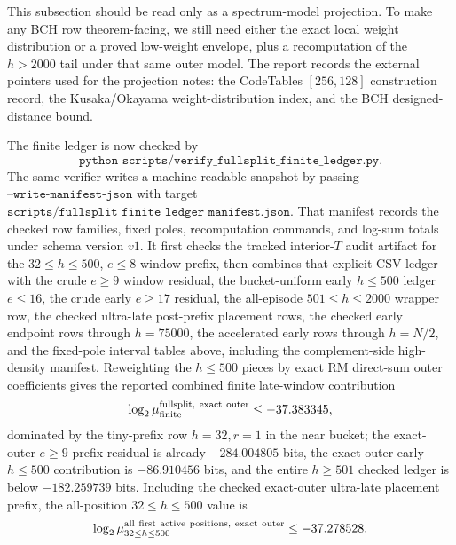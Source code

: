 This subsection should be read only as a spectrum-model projection.  To make any BCH row theorem-facing, we still need
either the exact local weight distribution or a proved low-weight envelope, plus a recomputation of the \(h>2000\) tail
under that same outer model.  The report records the external pointers used for the projection notes: the CodeTables
\([256,128]\) construction record, the Kusaka/Okayama weight-distribution index, and the BCH designed-distance bound.

The finite ledger is now checked by
\[
\texttt{python scripts/verify\_fullsplit\_finite\_ledger.py}.
\]
The same verifier writes a machine-readable snapshot by passing \(\texttt{--write-manifest-json}\) with target
\(\texttt{scripts/fullsplit\_finite\_ledger\_manifest.json}\).
That manifest records the checked row families, fixed poles, recomputation commands, and log-sum totals under schema
version \(v1\).
It first checks the tracked interior-\(T\) audit artifact for the \(32\le h\le500\), \(e\le8\) window prefix, then combines
that explicit CSV ledger with the crude \(e\ge9\) window residual, the bucket-uniform early \(h\le500\) ledger
\(e\le16\), the crude early \(e\ge17\) residual, the all-episode \(501\le h\le2000\) wrapper row, the checked
ultra-late post-prefix placement rows, the checked early endpoint rows through \(h=75000\), the accelerated early rows
through \(h=N/2\), and the fixed-pole interval tables above, including the complement-side high-density manifest.
Reweighting the \(h\le500\) pieces by exact
RM direct-sum outer coefficients gives the reported combined finite late-window contribution
\[
\log_2\mu_{\rm finite}^{\rm fullsplit,\ exact\ outer}\le -37.383345,
\]
dominated by the tiny-prefix row \(h=32,r=1\) in the near bucket; the exact-outer \(e\ge9\) prefix residual is already
\(-284.004805\) bits, the exact-outer early \(h\le500\) contribution is \(-86.910456\) bits, and the entire \(h\ge501\)
checked ledger is below \(-182.259739\) bits.  Including the checked exact-outer ultra-late placement prefix, the
all-position \(32\le h\le500\) value is
\[
\log_2\mu_{32\le h\le500}^{\rm all\ first\ active\ positions,\ exact\ outer}\le -37.278528.
\]

